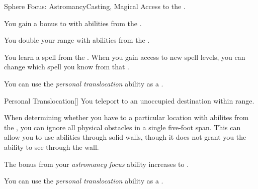     \begin{feat}{Sphere Focus: Astromancy}{Casting, Magical}
        \featpre Access to the  .

         You gain a  bonus to  with abilities from the  .

         You double your range with abilities from the  .

         You learn a spell from the  .
        When you gain access to new spell levels, you can change which spell you know from that .

         You can use the \textit{personal translocation} ability as a .
        \begin{freeability}{Personal Translocation}[]
            You teleport to an unoccupied destination within \rngclose range.
        \end{freeability}

         When determining whether you have  to a particular location with abilites from the  , you can ignore all physical obstacles in a single five-foot span.
        This can allow you to use abilities through solid walls, though it does not grant you the ability to see through the wall.

         The bonus from your \textit{astromancy focus} ability increases to .

         You can use the \textit{personal translocation} ability as a .
    \end{feat}

